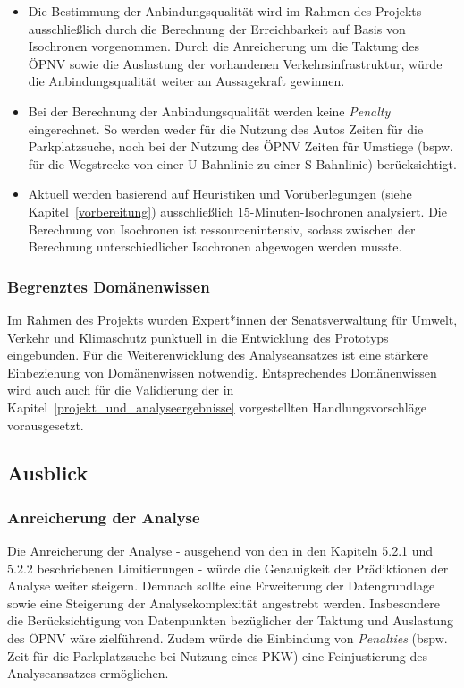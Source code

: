 \begin{itemize}
    \item Die Bestimmung der Anbindungsqualität wird im Rahmen des Projekts ausschließlich durch die Berechnung der Erreichbarkeit auf Basis von Isochronen vorgenommen. Durch die Anreicherung um die Taktung des ÖPNV sowie die Auslastung der vorhandenen Verkehrsinfrastruktur, würde die Anbindungsqualität weiter an Aussagekraft gewinnen.
    \item Bei der Berechnung der Anbindungsqualität werden keine \emph{Penalty} eingerechnet. So werden weder für die Nutzung des Autos Zeiten für die Parkplatzsuche, noch bei der Nutzung des ÖPNV Zeiten für Umstiege (bspw. für die Wegstrecke von einer U-Bahnlinie zu einer S-Bahnlinie) berücksichtigt.
    \item Aktuell werden basierend auf Heuristiken und Vorüberlegungen (siehe Kapitel~\ref{vorbereitung}) ausschließlich 15-Minuten-Isochronen analysiert​. Die Berechnung von Isochronen ist ressourcenintensiv, sodass zwischen der Berechnung unterschiedlicher Isochronen abgewogen werden musste.
\end{itemize}

\subsubsection{Begrenztes Domänenwissen}
Im Rahmen des Projekts wurden Expert*innen der Senatsverwaltung für Umwelt, Verkehr und Klimaschutz punktuell in die Entwicklung des Prototyps eingebunden. Für die Weiterenwicklung des Analyseansatzes ist eine stärkere Einbeziehung von Domänenwissen notwendig. Entsprechendes Domänenwissen wird auch auch für die Validierung der in Kapitel~\ref{projekt_und_analyseergebnisse} vorgestellten Handlungsvorschläge vorausgesetzt.

\subsection{Ausblick}

\subsubsection{Anreicherung der Analyse}
Die Anreicherung der Analyse - ausgehend von den in den Kapiteln 5.2.1 und 5.2.2 beschriebenen Limitierungen - würde die Genauigkeit der Prädiktionen der Analyse weiter steigern. Demnach sollte eine Erweiterung der Datengrundlage sowie eine Steigerung der Analysekomplexität angestrebt werden. Insbesondere die Berücksichtigung von Datenpunkten bezüglicher der Taktung und Auslastung des ÖPNV wäre zielführend. Zudem würde die Einbindung von \emph{Penalties} (bspw. Zeit für die Parkplatzsuche bei Nutzung eines PKW) eine Feinjustierung des Analyseansatzes ermöglichen.

